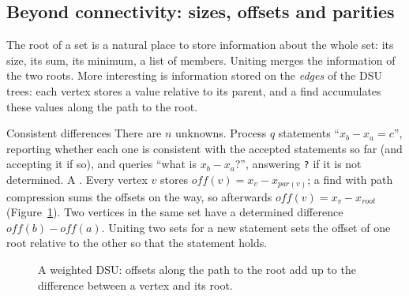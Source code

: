 \subsection{Beyond connectivity: sizes, offsets and parities}

The root of a set is a natural place to store information about the whole set: its size, its sum, its minimum, a list of
members. Uniting merges the information of the two roots. More interesting is information stored on the \emph{edges} of the
DSU trees: each vertex stores a value relative to its parent, and a find accumulates these values along the path to the root.

\begin{problem}{Consistent differences}
There are $n$ unknowns. Process $q$ statements ``$x_b - x_a = c$'', reporting whether each one is consistent with the accepted
statements so far (and accepting it if so), and queries ``what is $x_b - x_a$?'', answering \texttt{?} if it is not determined.
\solution A . Every vertex $v$ stores $\mathit{off}(v) = x_v - x_{\mathit{par}(v)}$; a find
with path compression sums the offsets on the way, so afterwards $\mathit{off}(v) = x_v - x_{\mathit{root}}$
(Figure~\ref{fig:weighteddsu}). Two vertices in the same set have a determined difference $\mathit{off}(b) - \mathit{off}(a)$.
Uniting two sets for a new statement sets the offset of one root relative to the other so that the statement holds.
\end{problem}

\begin{figure}[htbp]
\centering
{}
\caption{A weighted DSU: offsets along the path to the root add up to the difference between a vertex and its root.}
\label{fig:weighteddsu}
\end{figure}

